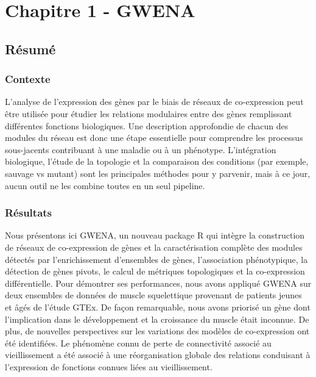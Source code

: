 \chapter{Chapitre 1 - GWENA}
\label{chapter:gwena}


\section{Résumé}

\subsection{Contexte}
L'analyse de l'expression des gènes par le biais de réseaux de co-expression peut être utilisée pour étudier les relations modulaires entre des gènes remplissant différentes fonctions biologiques. Une description approfondie de chacun des modules du réseau est donc une étape essentielle pour comprendre les processus sous-jacents contribuant à une maladie ou à un phénotype. L'intégration biologique, l'étude de la topologie et la comparaison des conditions (par exemple, sauvage vs mutant) sont les principales méthodes pour y parvenir, mais à ce jour, aucun outil ne les combine toutes en un seul pipeline.

\subsection{Résultats}
Nous présentons ici GWENA, un nouveau package R qui intègre la construction de réseaux de co-expression de gènes et la caractérisation complète des modules détectés par l'enrichissement d'ensembles de gènes, l'association phénotypique, la détection de gènes pivots, le calcul de métriques topologiques et la co-expression différentielle. Pour démontrer ses performances, nous avons appliqué GWENA sur deux ensembles de données de muscle squelettique provenant de patients jeunes et âgés de l'étude GTEx. De façon remarquable, nous avons priorisé un gène dont l'implication dans le développement et la croissance du muscle était inconnue. De plus, de nouvelles perspectives sur les variations des modèles de co-expression ont été identifiées. Le phénomène connu de perte de connectivité associé au vieillissement a été associé à une réorganisation globale des relations conduisant à l'expression de fonctions connues liées au vieillissement.

